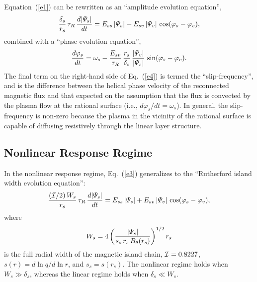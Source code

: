 \documentclass[12pt,prb,aps]{revtex4-1}
\begin{document}
Equation~(\ref{e1}) can be rewritten as an ``amplitude evolution equation'',
\begin{equation}\label{e3}
\frac{\delta_s}{r_s}\,\tau_R\,\frac{d|{\mit\Psi}_s|}{dt}= E_{ss}\,|{\mit\Psi}_s| + E_{sv}\,|{\mit\Psi}_v|\,\cos(\varphi_s-\varphi_v),
\end{equation}
combined with a ``phase evolution equation'', 
\begin{equation}\label{e4}
\frac{d\varphi_s}{dt} = \omega_s - \frac{E_{sv}}{\tau_R}\,\frac{r_s}{\delta_s}\,\frac{|{\mit\Psi}_v|}{|{\mit\Psi}_s|}\,\sin(\varphi_s-\varphi_v).
\end{equation}
The final term on the right-hand side of Eq.~(\ref{e4}) is termed the ``slip-frequency'', and is the difference between the helical phase velocity of
the reconnected magnetic flux and that expected on the  assumption that the flux is convected by the plasma flow at the
rational surface (i.e., $d\varphi_s/dt=\omega_s$). In general, the slip-frequency is non-zero because the plasma in the vicinity of the rational surface is capable of diffusing resistively 
through the linear layer structure. 

\subsection{Nonlinear Response Regime}
In the nonlinear response regime, Eq.~(\ref{e3}) generalizes to the ``Rutherford island width evolution equation'':\,\cite{ruth,ruth1}
\begin{equation}\label{e5}
\frac{({\cal I}/2)\,W_s}{r_s}\,\tau_R\,\frac{d|{\mit\Psi}_s|}{dt} = E_{ss}\,|{\mit\Psi}_s| + E_{sv}\,|{\mit\Psi}_v|\,\cos(\varphi_s-\varphi_v),
\end{equation}
where
\begin{equation}
W_s = 4\left(\frac{|{\mit\Psi}_s|}{s_s\,r_s\,B_\theta(r_s)}\right)^{1/2} r_s
\end{equation}
is the full radial width of the magnetic island chain, ${\cal I} = 0.8227$, $s(r) = d\ln q/d\ln r$, and $s_s=s(r_s)$. The
nonlinear regime holds when $W_s\gg \delta_s$, whereas the linear regime holds when $\delta_s\ll W_s$. 
\end{document}
